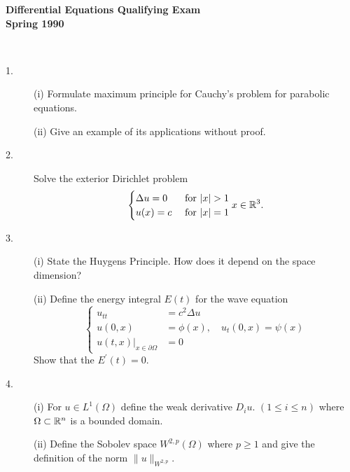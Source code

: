 \documentclass{article}
\begin{document}






\begin{center}\begin{LARGE}
{\bf Differential Equations Qualifying Exam}\\ 
{\bf Spring 1990}\\ \end{LARGE}
\end{center}
\vspace{0.1in}
\noindent\hrulefill\\

\begin{description}
\item[1.] (i)
Formulate maximum principle for Cauchy's problem for parabolic equations.

\item[\quad] (ii)
Give an example of its applications without proof.

\item[2.]
Solve the exterior Dirichlet problem
$$\begin{cases}
        \Delta u = 0 &\hbox{\ for\ } |x| > 1 \\
        u(x) = c &\hbox{\ for\ } |x| = 1
        \end{cases}
        x \in \Bbb R^3.$$

\item[3.] (i)
State the Huygens Principle. How does it depend on the space dimension?

\item[\quad] (ii)
Define the energy integral $E(t)$ for the wave equation
$$\begin{cases}
        u_{tt} &= c^2 \Delta u \\
        u(0,x) &=\phi(x), \quad u_t (0,x) = \psi (x) \\
        u(t,x)|_{x \in \partial \Omega} &= 0
        \end{cases}$$
Show that the $E^\prime (t) =0$.

\item[4.] (i)
For $u \in L^1 (\Omega)$ define the weak derivative $D_iu$.
$(1 \leq i \leq n)$ where $\Omega \subset \Bbb R^n$ is a bounded domain.

\item[\quad] (ii)
Define the Sobolev space $W^{2,p} (\Omega)$ where $p \geq 1$ and give the
definition of the norm $\parallel u \parallel_{W^{2,p}}$.


\end{description}
\end{document}
